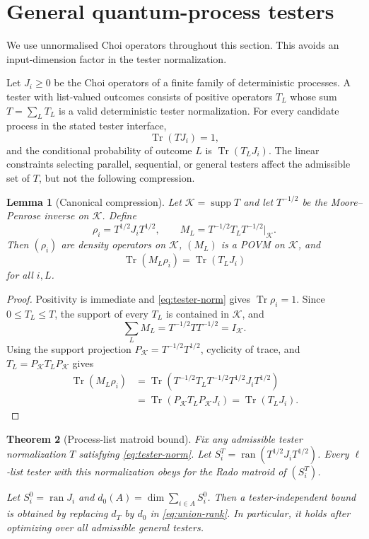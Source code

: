 \documentclass[11pt]{article}
\newtheorem{theorem}{Theorem}[section]
\newtheorem{lemma}[theorem]{Lemma}
\theoremstyle{definition}
\theoremstyle{remark}
\newcommand{\cK}{\mathcal K}
\newcommand{\ran}{\operatorname{ran}}
\newcommand{\supp}{\operatorname{supp}}
\newcommand{\Tr}{\operatorname{Tr}}
\begin{document}
\section{General quantum-process testers}\label{sec:process}

We use unnormalised Choi operators throughout this section.  This avoids an
input-dimension factor in the tester normalization.

Let $J_i\geq0$ be the Choi operators of a finite family of deterministic
processes.  A tester with list-valued outcomes consists of positive operators
$T_L$ whose sum $T=\sum_LT_L$ is a valid deterministic tester normalization.
For every candidate process in the stated tester interface,
\begin{equation}\label{eq:tester-norm}
 \Tr(TJ_i)=1,
\end{equation}
and the conditional probability of outcome $L$ is $\Tr(T_LJ_i)$.  The
linear constraints selecting parallel, sequential, or general testers affect
the admissible set of $T$, but not the following compression.

\begin{lemma}[Canonical compression]\label{lem:compression}
Let $\cK=\supp T$ and let $T^{-1/2}$ be the Moore--Penrose inverse on
$\cK$.  Define
\begin{equation}\label{eq:compression}
 \rho_i=T^{1/2}J_iT^{1/2},\qquad
 M_L=T^{-1/2}T_LT^{-1/2}\big|_{\cK}.
\end{equation}
Then $(\rho_i)$ are density operators on $\cK$, $(M_L)$ is a POVM on
$\cK$, and
\begin{equation}\label{eq:prob-preserve}
 \Tr(M_L\rho_i)=\Tr(T_LJ_i)
\end{equation}
for all $i,L$.
\end{lemma}

\begin{proof}
Positivity is immediate and \eqref{eq:tester-norm} gives
$\Tr\rho_i=1$.  Since $0\leq T_L\leq T$, the support of every $T_L$ is
contained in $\cK$, and
\[
 \sum_LM_L=T^{-1/2}TT^{-1/2}=I_{\cK}.
\]
Using the support projection $P_{\cK}=T^{-1/2}T^{1/2}$, cyclicity of trace,
and $T_L=P_{\cK}T_LP_{\cK}$ gives
\begin{align*}
 \Tr(M_L\rho_i)
 &=\Tr(T^{-1/2}T_LT^{-1/2}T^{1/2}J_iT^{1/2})\\
 &=\Tr(P_{\cK}T_LP_{\cK}J_i)=\Tr(T_LJ_i).
\end{align*}
\end{proof}

\begin{theorem}[Process-list matroid bound]\label{thm:process}
Fix any admissible tester normalization $T$ satisfying
\eqref{eq:tester-norm}.  Let
$S_i^T=\ran(T^{1/2}J_iT^{1/2})$.  Every $\ell$-list tester with this
normalization obeys  for the Rado matroid
of $(S_i^T)$.

Let $S_i^0=\ran J_i$ and
$d_0(A)=\dim\sum_{i\in A}S_i^0$.  Then a tester-independent bound is obtained
by replacing $d_T$ by $d_0$ in \eqref{eq:union-rank}.  In particular, it
holds after optimizing over all admissible general testers.
\end{theorem}
\end{document}
